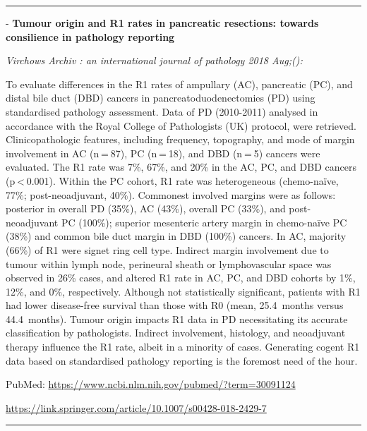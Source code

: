 \documentclass[]{article}
\begin{document}
{}

{}

\begin{center}\rule{0.5\linewidth}{\linethickness}\end{center}

 - \textbf{Tumour origin and R1 rates in pancreatic resections: towards
consilience in pathology reporting}

\emph{Virchows Archiv : an international journal of pathology 2018
Aug;():}

To evaluate differences in the R1 rates of ampullary (AC), pancreatic
(PC), and distal bile duct (DBD) cancers in pancreatoduodenectomies (PD)
using standardised pathology assessment. Data of PD (2010-2011) analysed
in accordance with the Royal College of Pathologists (UK) protocol, were
retrieved. Clinicopathologic features, including frequency, topography,
and mode of margin involvement in AC (n = 87), PC (n = 18), and DBD
(n = 5) cancers were evaluated. The R1 rate was 7\%, 67\%, and 20\% in
the AC, PC, and DBD cancers (p \textless{} 0.001). Within the PC cohort,
R1 rate was heterogeneous (chemo-naïve, 77\%; post-neoadjuvant, 40\%).
Commonest involved margins were as follows: posterior in overall PD
(35\%), AC (43\%), overall PC (33\%), and post-neoadjuvant PC (100\%);
superior mesenteric artery margin in chemo-naïve PC (38\%) and common
bile duct margin in DBD (100\%) cancers. In AC, majority (66\%) of R1
were signet ring cell type. Indirect margin involvement due to tumour
within lymph node, perineural sheath or lymphovascular space was
observed in 26\% cases, and altered R1 rate in AC, PC, and DBD cohorts
by 1\%, 12\%, and 0\%, respectively. Although not statistically
significant, patients with R1 had lower disease-free survival than those
with R0 (mean, 25.4~months versus 44.4~months). Tumour origin impacts R1
data in PD necessitating its accurate classification by pathologists.
Indirect involvement, histology, and neoadjuvant therapy influence the
R1 rate, albeit in a minority of cases. Generating cogent R1 data based
on standardised pathology reporting is the foremost need of the hour.

PubMed: \url{https://www.ncbi.nlm.nih.gov/pubmed/?term=30091124}

\url{https://link.springer.com/article/10.1007/s00428-018-2429-7}

{}

{}

\begin{center}\rule{0.5\linewidth}{\linethickness}\end{center}
\end{document}
